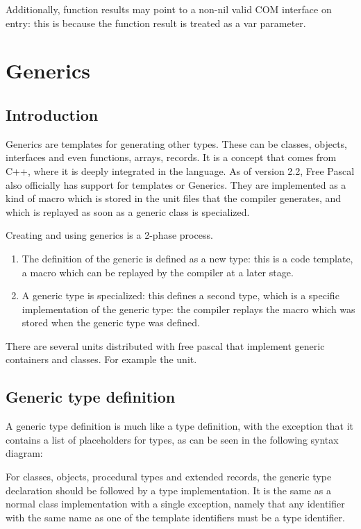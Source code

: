 Additionally, function results may point to a non-nil valid COM interface on
entry: this is because the function result is treated as a var parameter.

\chapter{Generics}
\label{ch:generics}
\section{Introduction}
\label{se:genericsintroduction}
Generics are templates for generating other types. These can be classes, objects, interfaces and even functions, arrays, records. 
It is a concept that comes from C++, where it is deeply integrated in the language. 
As of version 2.2, Free Pascal also officially has support for templates or Generics. 
They are implemented as a kind of macro which is stored in the unit files that the compiler generates, 
and which is replayed as soon as a generic class is specialized.

Creating and using generics is a 2-phase process.
\begin{enumerate}
\item The definition of the generic is defined as a new type: 
this is a code template, a macro which can be replayed by the compiler 
at a later stage.
\item A generic type is specialized: this defines a second type,
which is a specific implementation of the generic type: the compiler
replays the macro which was stored when the generic type was defined.
\end{enumerate}
There are several units distributed with free pascal that implement generic
containers and classes. For example the  unit. 

\section{Generic type definition}
A generic type definition is much like a type definition, with the exception that it contains a list of placeholders for types, 
as can be seen in the following syntax diagram:

For classes, objects, procedural types and extended records, the generic 
type declaration should be followed by a type implementation.
It is the same as a normal class implementation with a single exception,
namely that any identifier with the same name as one of the template
identifiers must be a type identifier.

